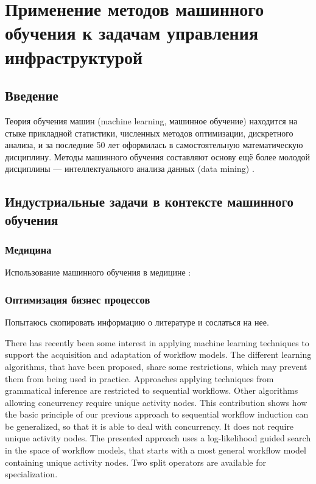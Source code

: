 \chapter{Применение методов машинного обучения к задачам управления инфраструктурой} \label{chapt1}

\section{Введение}

Теория обучения машин (machine learning, машинное обучение) находится на стыке прикладной статистики, численных методов оптимизации, дискретного анализа, и за последние 50 лет оформилась в самостоятельную математическую дисциплину. Методы машинного обучения составляют основу ещё более молодой дисциплины — интеллектуального анализа данных (data mining) \cite{воронцов2009машинное, marsland2015machineconway2012machine}.

\section{Индустриальные задачи в контексте машинного обучения} \label{sect1_1}
\subsection{Медицина}
Использование машинного обучения в медицине : \cite{shipp2002diffuse} \cite{ye2003predicting}

\subsection{Оптимизация бизнес процессов} \label{sect1_2_1}
Попытаюсь скопировать информацию о литературе и сослаться на нее. 

There has recently been some interest in applying machine learning techniques to support the acquisition and adaptation of workflow models. The different learning algorithms, that have been proposed, share some restrictions, which may prevent them from being used in practice. Approaches applying techniques from grammatical inference are restricted to sequential workflows. Other algorithms allowing concurrency require unique activity nodes. This contribution shows how the basic principle of our previous approach to sequential workflow induction can be generalized, so that it is able to deal with concurrency. It does not require unique activity nodes. The presented approach uses a log-likelihood guided search in the space of workflow models, that starts with a most general workflow model containing unique activity nodes. Two split operators are available for specialization. \cite{Herbst2000}


